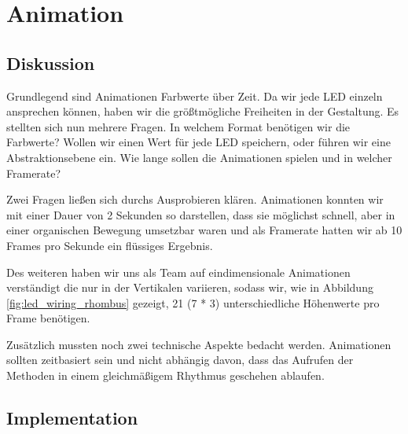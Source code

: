 \section{Animation}

    \subsection{Diskussion}

        Grundlegend sind Animationen Farbwerte über Zeit. Da wir jede LED einzeln ansprechen können, haben wir die größtmögliche Freiheiten in der Gestaltung.
        Es stellten sich nun mehrere Fragen. In welchem Format benötigen wir die Farbwerte? Wollen wir einen Wert für jede LED speichern, oder führen wir eine Abstraktionsebene ein. Wie lange sollen die Animationen spielen und in welcher Framerate?

        Zwei Fragen ließen sich durchs Ausprobieren klären.
        Animationen konnten wir mit einer Dauer von 2 Sekunden so darstellen, dass sie möglichst schnell, aber in einer organischen Bewegung umsetzbar waren und als Framerate hatten wir ab 10 Frames pro Sekunde ein flüssiges Ergebnis.

        Des weiteren haben wir uns als Team auf eindimensionale Animationen verständigt die nur in der Vertikalen variieren, sodass wir, wie in Abbildung\,\ref{fig:led_wiring_rhombus} gezeigt, 21 (7 * 3) unterschiedliche Höhenwerte pro Frame benötigen.

        Zusätzlich mussten noch zwei technische Aspekte bedacht werden.
        Animationen sollten zeitbasiert sein und nicht abhängig davon, dass das Aufrufen der Methoden in einem gleichmäßigem Rhythmus geschehen ablaufen.

    \subsection{Implementation}

